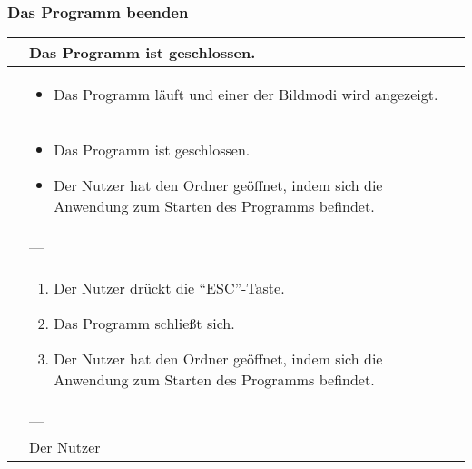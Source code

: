 \subsubsection{Das Programm beenden}
\begin{center}
	\begin{longtable}{| p{3cm} | p{12cm} |}
		\hline
		\goal & Das Programm ist geschlossen. \\ \hline
		
		\precondition & \begin{itemize}
			\item Das Programm läuft und einer der Bildmodi wird angezeigt.
		\end{itemize} \\ \hline
		
		\postcondition & \begin{itemize}
			\item Das Programm ist geschlossen.
			\item Der Nutzer hat den Ordner geöffnet, indem sich die Anwendung zum Starten des Programms befindet.
		\end{itemize} \\ \hline
		
		\postexception & --- \\ \hline
		
		\flow & \begin{enumerate}
			\item Der Nutzer drückt die \enquote{ESC}-Taste.
			\item Das Programm schließt sich.
			\item Der Nutzer hat den Ordner geöffnet, indem sich die Anwendung zum Starten des Programms befindet.			
		\end{enumerate} \\ \hline
		
		\exception & --- \\ \hline
		
		\player & Der Nutzer \\
		\hline
	\end{longtable}
\end{center}

